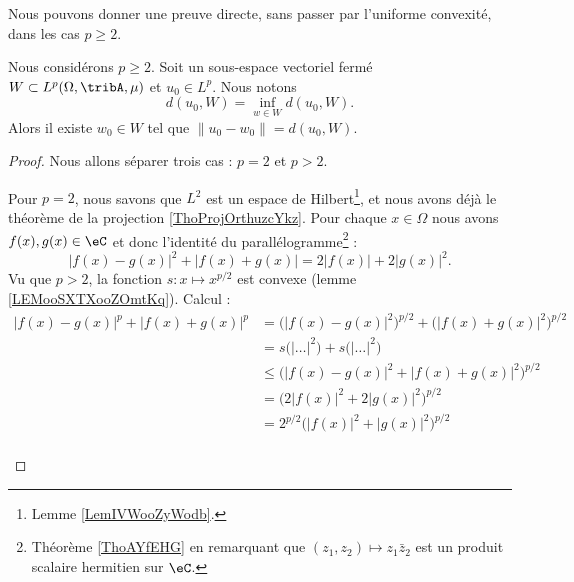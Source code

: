 	Nous pouvons donner une preuve directe, sans passer par l'uniforme convexité, dans les cas \( p\geq 2\).
	\begin{theorem} \label{THOooRJFUooQivDKm}
		Nous considérons \( p\geq 2\). Soit un sous-espace vectoriel fermé \( W\subset L^p(\Omega,\tribA,\mu)\) et \( u_0\in L^p\). Nous notons
		\begin{equation}
			d(u_0,W)=\inf_{w\in W}d(u_0,W).
		\end{equation}
		Alors il existe \( w_0\in W\) tel que \( \| u_0-w_0 \|=d(u_0,W)\).
	\end{theorem}

	\begin{proof}
		Nous allons séparer trois cas : \( p=2\) et \( p>2\).
		\begin{subproof}
			\spitem[\( p=2\)]
			Pour \( p=2\), nous savons que \( L^2\) est un espace de Hilbert\footnote{Lemme \ref{LemIVWooZyWodb}.}, et nous avons déjà le théorème de la projection \ref{ThoProjOrthuzcYkz}.
			\spitem[\( p>2\)]
			Pour chaque \( x\in \Omega\) nous avons \( f(x), g(x)\in \eC\) et donc l'identité du parallélogramme\footnote{Théorème \ref{ThoAYfEHG} en remarquant que \( (z_1,z_2)\mapsto z_1\bar z_2\) est un produit scalaire hermitien sur \( \eC\).} :
			\begin{equation}        \label{EQooUBFEooDUjLnb}
				\big| f(x)-g(x) \big|^2+\big| f(x)+g(x) \big|=2| f(x) |+2| g(x) |^2.
			\end{equation}
			Vu que \( p>2\), la fonction \( s\colon x\mapsto  x^{p/2}\) est convexe (lemme \ref{LEMooSXTXooZOmtKq}). Calcul :
			\begin{subequations}
				\begin{align}
					| f(x)-g(x) |^p+| f(x)+g(x) |^p & =\big( | f(x)-g(x) |^2 \big)^{p/2}+\big( | f(x)+g(x) |^2 \big)^{p/2}                    \\
					                                & =s\big( | \ldots |^2 \big)+s\big( | \ldots |^2 \big)                                    \\
					                                & \leq \big( | f(x)-g(x) |^2+| f(x)+g(x) |^2 \big)^{p/2}     \label{SUBEQooRHAEooHkYNLH}  \\
					                                & =\big( 2| f(x) |^2+2| g(x) |^2 \big)^{p/2}                 \label{SUBEQooQFSLooJkoeqN}  \\
					                                & =2^{p/2}\big( | f(x) |^2+| g(x) |^2 \big)^{p/2}                                         \\

\end{align}
\end{subequations}
\end{subproof}
\end{proof}

